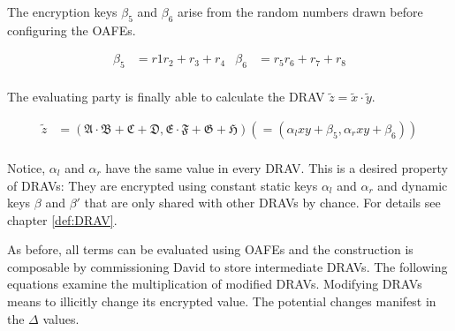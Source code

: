 \noindent{}The encryption keys $\beta_5$ and $\beta_6$ arise from the random
numbers drawn before configuring the OAFEs.

\begin{align*}
  \beta_5 & = r1r_2 + r_3 + r_4 &
  \beta_6 & = r_5r_6 + r_7 + r_8 \\
\end{align*}

\noindent{}The evaluating party is finally able to calculate the DRAV
$\widetilde{z} = \widetilde{x} \cdot \widetilde{y}$.

\begin{align*}
  \widetilde{z} & = (\mathfrak{A} \cdot \mathfrak{B}+\mathfrak{C}+\mathfrak{D}
                    ,\mathfrak{E} \cdot \mathfrak{F}+\mathfrak{G}+\mathfrak{H})
                    (= (\alpha_l xy + \beta_5, \alpha_r xy + \beta_6)) \\
\end{align*}

Notice, $\alpha_l$ and $\alpha_r$ have the same value in every DRAV. This is a
desired property of DRAVs: They are encrypted using constant static keys
$\alpha_l$ and $\alpha_r$ and dynamic keys $\beta$ and $\beta'$ that are only
shared with other DRAVs by chance. For details see chapter \ref{def:DRAV}.

As before, all terms can be evaluated using OAFEs and the construction is
composable by commissioning David to store intermediate DRAVs. The following
equations examine the multiplication of modified DRAVs. Modifying DRAVs means to
illicitly change its encrypted value. The potential changes manifest in the
$\Delta$ values.

